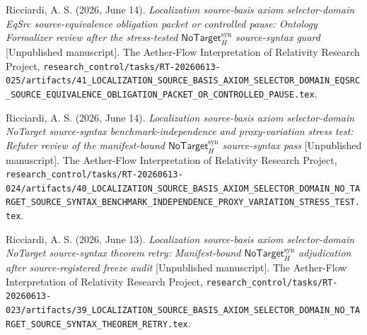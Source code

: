 \documentclass[11pt]{article}
\newcommand{\NoTargetSyn}{\mathsf{NoTarget}_{H}^{\mathrm{syn}}}
\begin{document}
Ricciardi, A. S. (2026, June 14). \emph{Localization source-basis axiom
selector-domain EqSrc source-equivalence obligation packet or controlled
pause: Ontology Formalizer review after the stress-tested
\(\NoTargetSyn\) source-syntax guard} [Unpublished manuscript]. The
Aether-Flow Interpretation of Relativity Research Project,
\texttt{research\_control/tasks/RT-20260613-025/artifacts/41\_LOCALIZATION\_SOURCE\_BASIS\_AXIOM\_SELECTOR\_DOMAIN\_EQSRC\_SOURCE\_EQUIVALENCE\_OBLIGATION\_PACKET\_OR\_CONTROLLED\_PAUSE.tex}.

Ricciardi, A. S. (2026, June 14). \emph{Localization source-basis axiom
selector-domain NoTarget source-syntax benchmark-independence and
proxy-variation stress test: Refuter review of the manifest-bound
\(\NoTargetSyn\) source-syntax pass} [Unpublished manuscript]. The
Aether-Flow Interpretation of Relativity Research Project,
\texttt{research\_control/tasks/RT-20260613-024/artifacts/40\_LOCALIZATION\_SOURCE\_BASIS\_AXIOM\_SELECTOR\_DOMAIN\_NO\_TARGET\_SOURCE\_SYNTAX\_BENCHMARK\_INDEPENDENCE\_PROXY\_VARIATION\_STRESS\_TEST.tex}.

Ricciardi, A. S. (2026, June 13). \emph{Localization source-basis axiom
selector-domain NoTarget source-syntax theorem retry: Manifest-bound
\(\NoTargetSyn\) adjudication after source-registered freeze audit}
[Unpublished manuscript]. The Aether-Flow Interpretation of Relativity
Research Project,
\texttt{research\_control/tasks/RT-20260613-023/artifacts/39\_LOCALIZATION\_SOURCE\_BASIS\_AXIOM\_SELECTOR\_DOMAIN\_NO\_TARGET\_SOURCE\_SYNTAX\_THEOREM\_RETRY.tex}.
\end{document}
